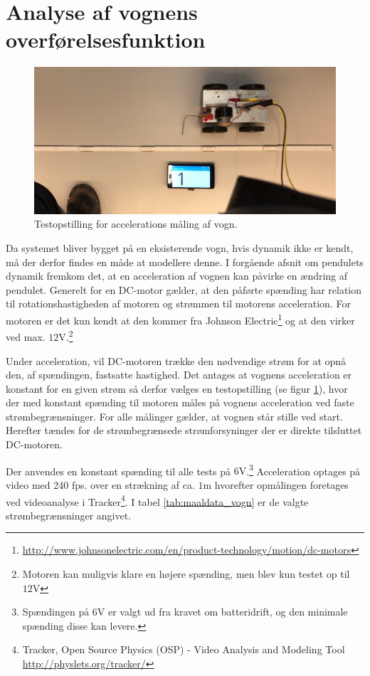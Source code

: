 \section{Analyse af vognens overførelsesfunktion}\label{sec:sec_motoroverforelse}
\begin{figure}
	\centering
	\includegraphics[width=.48\textwidth]{billeder/testopstilling_vogn.png}
	\caption{Testopstilling for accelerations måling af vogn.}
	\label{fig:testopstilling_vogn}
\end{figure}
\FloatBlock

Da systemet bliver bygget på en eksisterende vogn, hvis dynamik ikke er kendt, må der derfor findes en måde at modellere denne.
I forgående afsnit om pendulets dynamik fremkom det, at en acceleration af vognen kan påvirke en ændring af pendulet.
Generelt for en DC-motor gælder, at den påførte spænding har relation til rotationshastigheden af motoren og strømmen til motorens acceleration.    
For motoren er det kun kendt at den kommer fra Johnson Electric\footnote{\url{http://www.johnsonelectric.com/en/product-technology/motion/dc-motors}} og at den virker ved max. $12 \si{\volt}.$\footnote{Motoren kan muligvis klare en højere spænding, men blev kun testet op til $12\si{\volt}$} 

Under acceleration, vil DC-motoren trække den nødvendige strøm for at opnå den, af spændingen, fastsatte hastighed. 
Det antages at vognens acceleration er konstant for en given strøm så derfor vælges en testopstilling (se figur \ref{fig:testopstilling_vogn}), hvor der med konstant spænding til motoren måles på vognens acceleration ved faste strømbegrænsninger.
For alle målinger gælder, at vognen står stille ved start.
Herefter tændes for de strømbegrænsede strømforsyninger der er direkte tilsluttet DC-motoren. 

Der anvendes en konstant spænding til alle tests på $6 \si{\volt}$.\footnote{Spændingen på  $6 \si{\volt}$ er valgt ud fra kravet om batteridrift, og den minimale spænding disse kan levere.}
Acceleration optages på video med 240 fps. over en strækning af ca. $1 \si{\meter}$ hvorefter opmålingen foretages ved videoanalyse i Tracker\footnote{Tracker, Open Source Physics (OSP) - Video Analysis and Modeling Tool \url{http://physlets.org/tracker/}}.
I tabel \ref{tab:maaldata_vogn} er de valgte strømbegrænsninger angivet.

